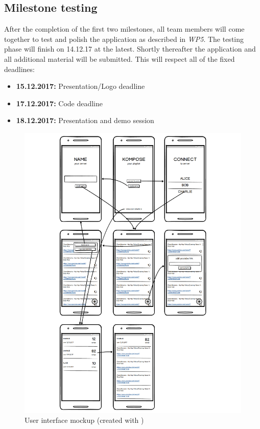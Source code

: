 \documentclass{report}
\begin{document}
\subsection{Milestone testing}
After the completion of the first two milestones, all team members will come together to test and polish the application
as described in \emph{WP5}. The testing phase will finish on 14.12.17 at the latest. Shortly thereafter the application and 
all additional material will be submitted. This will respect all of the fixed deadlines:

\begin{itemize}
    \item {\bf 15.12.2017:} Presentation/Logo deadline
    \item {\bf 17.12.2017:} Code deadline
    \item {\bf 18.12.2017:} Presentation and demo session
\end{itemize}



\begin{figure}
    \includegraphics[width=\textwidth]{../design/mockups.pdf}
    \caption{User interface mockup (created with \cite{balsamiq})}
\end{figure}
\end{document}
